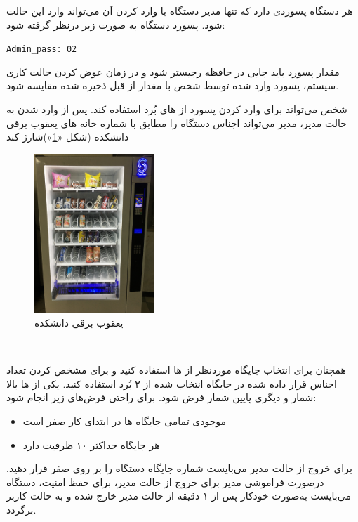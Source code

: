 \documentclass[]{article}
\begin{document}
هر دستگاه پسوردی دارد که تنها مدیر دستگاه با وارد کردن آن می‌تواند وارد این حالت شود. پسورد دستگاه به صورت زیر درنظر گرفته شود:

\begin{latin}
	\texttt{Admin\_pass: 02}
\end{latin}



مقدار پسورد باید جایی در حافظه رجیستر شود و در زمان عوض کردن حالت کاری سیستم، پسورد وارد شده توسط شخص با مقدار از قبل ذخیره شده مقایسه شود.

شخص می‌تواند برای وارد کردن پسورد از  های بُرد استفاده کند. پس از وارد شدن به حالت مدیر، مدیر می‌تواند اجناس دستگاه را مطابق با شماره خانه های یعقوب برقی دانشکده (شکل «\textcolor{blue}{\ref{یعقوب برقی دانشکده}}»)شارژ کند



\begin{figure}[h]
	\centering
	\includegraphics[width=0.4\textwidth]{images/img2.jpg}
	\caption{یعقوب برقی دانشکده}
	\label{یعقوب برقی دانشکده}
\end{figure}

\newpage
\Large \textbf{\\
}

همچنان برای انتخاب جایگاه موردنظر از  ها استفاده کنید و برای مشخص کردن تعداد اجناس قرار داده شده در جایگاه انتخاب شده از ۲  بُرد استفاده کنید. یکی از  ها بالا شمار و دیگری پایین شمار فرض شود. برای راحتی فرض‌های زیر انجام شود:

\begin{itemize}
	\item موجودی تمامی جایگاه ها در ابتدای کار صفر است
	\item هر جایگاه حداکثر ۱۰ ظرفیت دارد
\end{itemize}

برای خروج از حالت مدیر می‌بایست شماره جایگاه‌ دستگاه را بر روی صفر قرار دهید. درصورت فراموشی مدیر برای خروج از حالت مدیر، برای حفظ امنیت، دستگاه می‌بایست به‌صورت خودکار پس از ۱ دقیقه از حالت مدیر خارج شده و به حالت کاربر برگردد.
\end{document}
